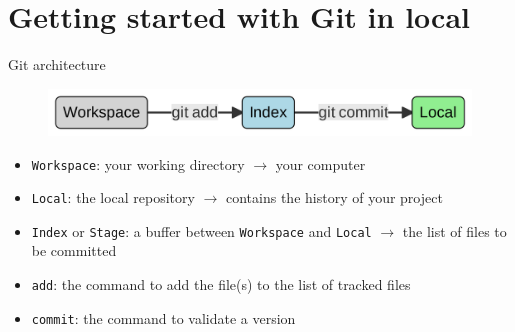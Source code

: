 \documentclass[10pt]{beamer}
\begin{document}
\section{Getting started with Git in local}







\begin{frame}[fragile]{Git architecture}
\protect\hypertarget{git-architecture}{}
\begin{figure}[H]

{\centering \includegraphics[width=\textwidth]{mermaid/mermaid-figure-1.png}

}

\end{figure}

\begin{itemize}
    \item
     \texttt{Workspace}: your working directory \(\rightarrow\) your
      computer
    \item
    \texttt{Local}: the local repository \(\rightarrow\) contains the
  history of your project
\item
  \texttt{Index} or \texttt{Stage}:  a buffer between \texttt{Workspace} and \texttt{Local}
  \(\rightarrow\) the list of files to be committed 
 \item
  \texttt{add}: the command to add the file(s) to the list of tracked files
  \item
  \texttt{commit}: the command to validate a version
\end{itemize}
\end{frame}
\end{document}
